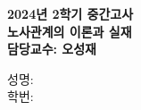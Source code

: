 \documentclass[11pt,answers]{exam}
\begin{document}

    \begin{center}
        {\Large \textbf{2024년 2학기 중간고사}} \\
        \vspace{2mm}
        \textbf{노사관계의 이론과 실재} \\
        \vspace{2mm}
        \textbf{담당교수: 오성재}
    \end{center}
    \vspace{0.2cm}

    \noindent
    성명: \makebox[.3\textwidth]{\hrulefill} \\[3pt]
    학번: \makebox[.3\textwidth]{\hrulefill}
\end{document}
